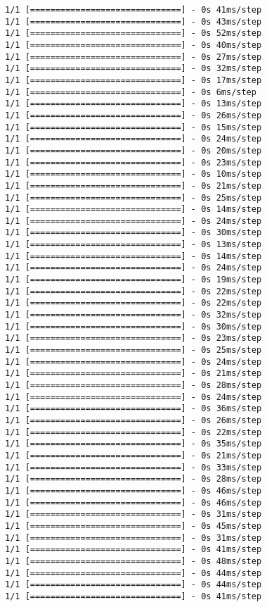 \documentclass[11pt]{article}
\begin{document}
\begin{Verbatim}[commandchars=\\\{\}]
1/1 [==============================] - 0s 41ms/step
1/1 [==============================] - 0s 43ms/step
1/1 [==============================] - 0s 52ms/step
1/1 [==============================] - 0s 40ms/step
1/1 [==============================] - 0s 27ms/step
1/1 [==============================] - 0s 32ms/step
1/1 [==============================] - 0s 17ms/step
1/1 [==============================] - 0s 6ms/step
1/1 [==============================] - 0s 13ms/step
1/1 [==============================] - 0s 26ms/step
1/1 [==============================] - 0s 15ms/step
1/1 [==============================] - 0s 24ms/step
1/1 [==============================] - 0s 20ms/step
1/1 [==============================] - 0s 23ms/step
1/1 [==============================] - 0s 10ms/step
1/1 [==============================] - 0s 21ms/step
1/1 [==============================] - 0s 25ms/step
1/1 [==============================] - 0s 14ms/step
1/1 [==============================] - 0s 24ms/step
1/1 [==============================] - 0s 30ms/step
1/1 [==============================] - 0s 13ms/step
1/1 [==============================] - 0s 14ms/step
1/1 [==============================] - 0s 24ms/step
1/1 [==============================] - 0s 19ms/step
1/1 [==============================] - 0s 22ms/step
1/1 [==============================] - 0s 22ms/step
1/1 [==============================] - 0s 32ms/step
1/1 [==============================] - 0s 30ms/step
1/1 [==============================] - 0s 23ms/step
1/1 [==============================] - 0s 25ms/step
1/1 [==============================] - 0s 24ms/step
1/1 [==============================] - 0s 21ms/step
1/1 [==============================] - 0s 28ms/step
1/1 [==============================] - 0s 24ms/step
1/1 [==============================] - 0s 36ms/step
1/1 [==============================] - 0s 26ms/step
1/1 [==============================] - 0s 22ms/step
1/1 [==============================] - 0s 35ms/step
1/1 [==============================] - 0s 21ms/step
1/1 [==============================] - 0s 33ms/step
1/1 [==============================] - 0s 28ms/step
1/1 [==============================] - 0s 46ms/step
1/1 [==============================] - 0s 46ms/step
1/1 [==============================] - 0s 31ms/step
1/1 [==============================] - 0s 45ms/step
1/1 [==============================] - 0s 31ms/step
1/1 [==============================] - 0s 41ms/step
1/1 [==============================] - 0s 48ms/step
1/1 [==============================] - 0s 44ms/step
1/1 [==============================] - 0s 44ms/step
1/1 [==============================] - 0s 41ms/step

\end{Verbatim}
\end{document}
